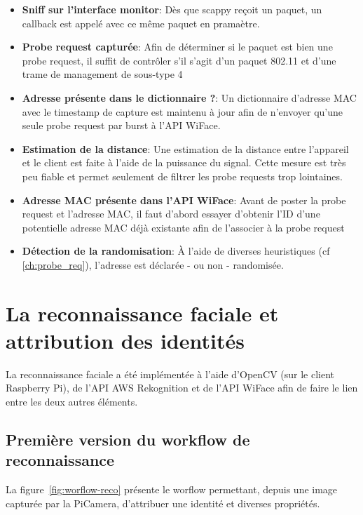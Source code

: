 \begin{itemize}
    \item \textbf{Sniff sur l'interface monitor}: Dès que scappy reçoit un paquet, un callback est appelé avec ce même paquet en pramaètre.
    \item \textbf{Probe request capturée}: Afin de déterminer si le paquet est bien une probe request, il suffit de contrôler s'il s'agit d'un paquet 802.11 et d'une trame de management de sous-type 4
    \item \textbf{Adresse présente dans le dictionnaire ?}: Un dictionnaire d'adresse MAC avec le timestamp de capture est maintenu à jour afin de n'envoyer qu'une seule probe request par burst à l'API WiFace.
    \item \textbf{Estimation de la distance}: Une estimation de la distance entre l'appareil et le client est faite à l'aide de la puissance du signal. Cette mesure est très peu fiable et permet seulement de filtrer les probe requests trop lointaines.
    \item \textbf{Adresse MAC présente dans l'API WiFace}: Avant de poster la probe request et l'adresse MAC, il faut d'abord essayer d'obtenir l'ID d'une potentielle adresse MAC déjà existante afin de l'associer à la probe request
    \item \textbf{Détection de la randomisation}: À l'aide de diverses heuristiques (cf \ref{ch:probe_req}), l'adresse est déclarée - ou non - randomisée.
\end{itemize}

\section{La reconnaissance faciale et attribution des identités}

La reconnaissance faciale a été implémentée à l'aide d'OpenCV (sur le client Raspberry Pi), de l'API AWS Rekognition et de l'API WiFace
afin de faire le lien entre les deux autres éléments. 

\subsection{Première version du workflow de reconnaissance}

La figure~\ref{fig:worflow-reco} présente le worflow permettant, depuis une image capturée par la PiCamera, d'attribuer une identité et diverses propriétés.

\clearpage
\newpage

